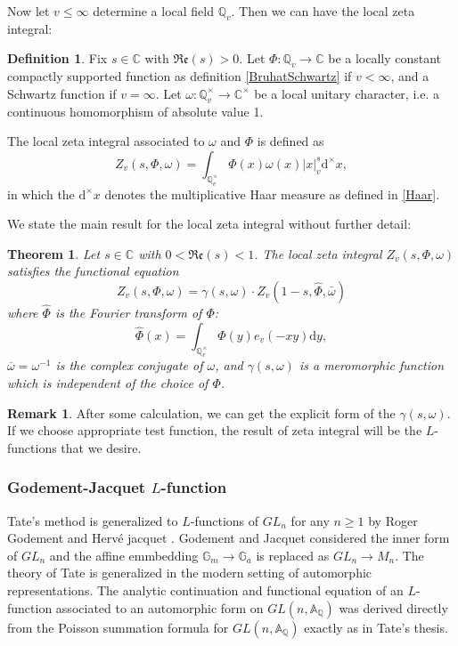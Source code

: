 \documentclass[12pt,a4paper,english]{article}
\theoremstyle{plain}
\newtheorem{thm}{Theorem}[section]
\theoremstyle{definition}
\newtheorem{defi}{Definition}
\newtheorem*{rem}{Remark}
\begin{document}
Now let $v\leq \infty$ determine a local field $\mathbb{Q}_{v}$. Then we can have the local zeta integral:
\begin{defi}
    Fix $s\in\mathbb{C}$ with $\mathfrak{Re}(s)>0$. Let $\Phi:\mathbb{Q}_{v}\rightarrow \mathbb{C}$ be a locally constant compactly supported function as definition \ref{BruhatSchwartz} if $v<\infty$, and a Schwartz function if $v=\infty$. Let $\omega:\mathbb{Q}^{\times}_{v}\rightarrow\mathbb{C}^{\times}$ be a local unitary character, i.e. a continuous homomorphism of absolute value 1. 
    
    The local zeta integral associated to $\omega$ and $\Phi$ is defined as 
    \begin{equation*}
        Z_{v}(s,\Phi, \omega)=\int_{\mathbb{Q}^{\times}_{v}}\Phi(x)\omega(x)|x|^{s}_{v}\text{d}^{\times}x,
    \end{equation*}
    in which the $\text{d}^{\times}x$ denotes the multiplicative Haar measure as defined in \ref{Haar}.
\end{defi}
We state the main result for the local zeta integral without further detail:
\begin{thm}
Let $s\in\mathbb{C}$ with $0<\mathfrak{Re}(s)<1$. The local zeta integral $Z_{v}(s,\Phi,\omega)$ satisfies the functional equation
\begin{equation*}
    Z_{v}(s,\Phi,\omega)=\gamma(s,\omega)\cdot Z_{v}(1-s,\hat{\Phi},\bar{\omega})
\end{equation*}
where $\hat{\Phi}$ is the Fourier transform of $\Phi$: 
\begin{equation*}
    \hat{\Phi}(x )=\int_{\mathbb{Q}^{\times}_{v}}\Phi(y)e_{v}(-xy)\text{d}y,
\end{equation*}
$\overline{\omega}=\omega^{-1}$ is the complex conjugate of $\omega$, and $\gamma(s,\omega)$ is a meromorphic function which is independent of the choice of $\Phi$.
\end{thm}
\begin{rem}
After some calculation, we can get the explicit form of the $\gamma(s,\omega)$. If we choose appropriate test function, the result of zeta integral will be the $L$-functions that we desire.
\end{rem}
\subsubsection{Godement-Jacquet $L$-function}
Tate's method is generalized to $L$-functions of $GL_{n}$ for any $n\geq1$ by Roger Godement and Herv\'{e} jacquet \cite{goldfeld2006automorphic}. Godement and Jacquet considered the inner form of $GL_{n}$ and the affine emmbedding $\mathbb{G}_{m}\rightarrow\mathbb{G}_{a}$ is replaced as $GL_{n}\rightarrow M_{n}$. The theory of Tate is generalized in the modern setting of automorphic representations. The analytic continuation and functional equation of an $L$-function associated to an automorphic form on $GL(n,\mathbb{A}_{\mathbb{Q}})$ was derived directly from the Poisson summation formula for $GL(n,\mathbb{A}_{\mathbb{Q}})$ exactly as in Tate's thesis.
\end{document}
